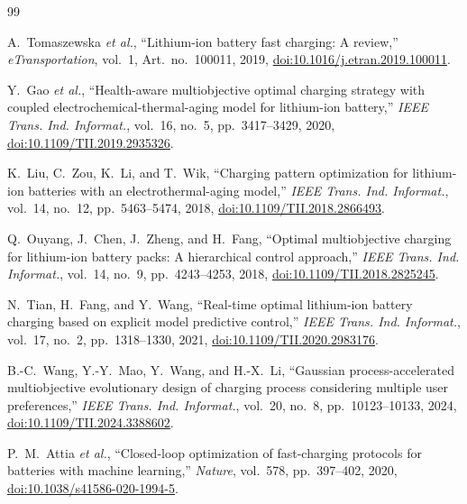 \documentclass[journal,10pt]{IEEEtran}
\begin{document}
\begin{thebibliography}{99}

A.~Tomaszewska \textit{et al.},
``Lithium-ion battery fast charging: A review,''
\textit{eTransportation}, vol.~1, Art.~no.~100011, 2019,
\href{https://doi.org/10.1016/j.etran.2019.100011}
{doi:10.1016/j.etran.2019.100011}.

Y.~Gao \textit{et al.},
``Health-aware multiobjective optimal charging strategy with coupled
electrochemical-thermal-aging model for lithium-ion battery,''
\textit{IEEE Trans. Ind. Informat.},
vol.~16, no.~5, pp.~3417--3429, 2020,
\href{https://doi.org/10.1109/TII.2019.2935326}
{doi:10.1109/TII.2019.2935326}.

K.~Liu, C.~Zou, K.~Li, and T.~Wik,
``Charging pattern optimization for lithium-ion batteries with an
electrothermal-aging model,''
\textit{IEEE Trans. Ind. Informat.},
vol.~14, no.~12, pp.~5463--5474, 2018,
\href{https://doi.org/10.1109/TII.2018.2866493}
{doi:10.1109/TII.2018.2866493}.

Q.~Ouyang, J.~Chen, J.~Zheng, and H.~Fang,
``Optimal multiobjective charging for lithium-ion battery packs:
A hierarchical control approach,''
\textit{IEEE Trans. Ind. Informat.},
vol.~14, no.~9, pp.~4243--4253, 2018,
\href{https://doi.org/10.1109/TII.2018.2825245}
{doi:10.1109/TII.2018.2825245}.

N.~Tian, H.~Fang, and Y.~Wang,
``Real-time optimal lithium-ion battery charging based on explicit
model predictive control,''
\textit{IEEE Trans. Ind. Informat.},
vol.~17, no.~2, pp.~1318--1330, 2021,
\href{https://doi.org/10.1109/TII.2020.2983176}
{doi:10.1109/TII.2020.2983176}.

B.-C.~Wang, Y.-Y.~Mao, Y.~Wang, and H.-X.~Li,
``Gaussian process-accelerated multiobjective evolutionary design
of charging process considering multiple user preferences,''
\textit{IEEE Trans. Ind. Informat.},
vol.~20, no.~8, pp.~10123--10133, 2024,
\href{https://doi.org/10.1109/TII.2024.3388602}
{doi:10.1109/TII.2024.3388602}.

P.~M.~Attia \textit{et al.},
``Closed-loop optimization of fast-charging protocols for batteries
with machine learning,''
\textit{Nature}, vol.~578, pp.~397--402, 2020,
\href{https://doi.org/10.1038/s41586-020-1994-5}
{doi:10.1038/s41586-020-1994-5}.


\end{thebibliography}
\end{document}
